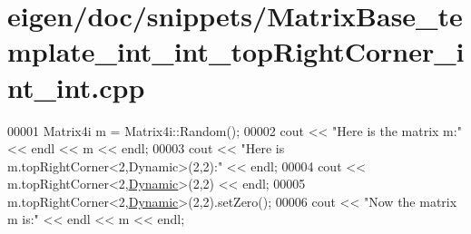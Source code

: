 \hypertarget{eigen_2doc_2snippets_2_matrix_base__template__int__int__top_right_corner__int__int_8cpp_source}{}\section{eigen/doc/snippets/\+Matrix\+Base\+\_\+template\+\_\+int\+\_\+int\+\_\+top\+Right\+Corner\+\_\+int\+\_\+int.cpp}
\label{eigen_2doc_2snippets_2_matrix_base__template__int__int__top_right_corner__int__int_8cpp_source}

\begin{DoxyCode}
00001 Matrix4i m = Matrix4i::Random();
00002 cout << \textcolor{stringliteral}{"Here is the matrix m:"} << endl << m << endl;
00003 cout << \textcolor{stringliteral}{"Here is m.topRightCorner<2,Dynamic>(2,2):"} << endl;
00004 cout << m.topRightCorner<2,\hyperlink{namespace_eigen_ad81fa7195215a0ce30017dfac309f0b2}{Dynamic}>(2,2) << endl;
00005 m.topRightCorner<2,\hyperlink{namespace_eigen_ad81fa7195215a0ce30017dfac309f0b2}{Dynamic}>(2,2).setZero();
00006 cout << \textcolor{stringliteral}{"Now the matrix m is:"} << endl << m << endl;
\end{DoxyCode}
